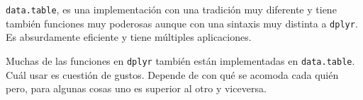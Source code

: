 \documentclass[]{article}
\begin{document}
\texttt{data.table}, es una implementación con una tradición muy
diferente y tiene también funciones muy poderosas aunque con una
sintaxis muy distinta a \texttt{dplyr}. Es absurdamente eficiente y
tiene múltiples aplicaciones.

Muchas de las funciones en \texttt{dplyr} también están implementadas en
\texttt{data.table}. Cuál usar es cuestión de gustos. Depende de con qué
se acomoda cada quién pero, para algunas cosas uno es superior al otro y
viceversa.
\end{document}
